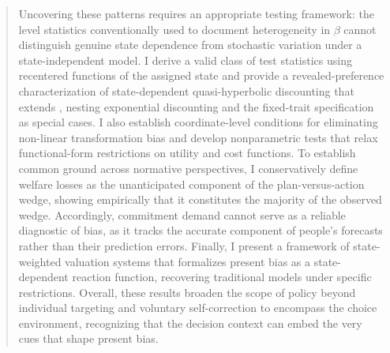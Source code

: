 \documentclass[11pt,a4paper]{article}
\theoremstyle{plain}
\theoremstyle{definition}
\begin{document}
\begin{abstract}
Uncovering these patterns requires an appropriate testing framework: the level statistics conventionally used to document heterogeneity in $\beta$ cannot distinguish genuine state dependence from stochastic variation under a state-independent model.
I derive a valid class of test statistics using recentered functions of the assigned state and provide a revealed-preference characterization of state-dependent quasi-hyperbolic discounting that extends \citet{eis2020}, nesting exponential discounting and the fixed-trait specification as special cases.
I also establish coordinate-level conditions for eliminating non-linear transformation bias and develop nonparametric tests that relax functional-form restrictions on utility and cost functions.
To establish common ground across normative perspectives, I conservatively define welfare losses as the unanticipated component of the plan-versus-action wedge, showing empirically that it constitutes the majority of the observed wedge.
Accordingly, commitment demand cannot serve as a reliable diagnostic of bias, as it tracks the accurate component of people's forecasts rather than their prediction errors.
Finally, I present a framework of state-weighted valuation systems that formalizes present bias as a state-dependent reaction function, recovering traditional models under specific restrictions.
Overall, these results broaden the scope of policy beyond individual targeting and voluntary self-correction to encompass the choice environment, recognizing that the decision context can embed the very cues that shape present bias.



\end{abstract}
\end{document}
